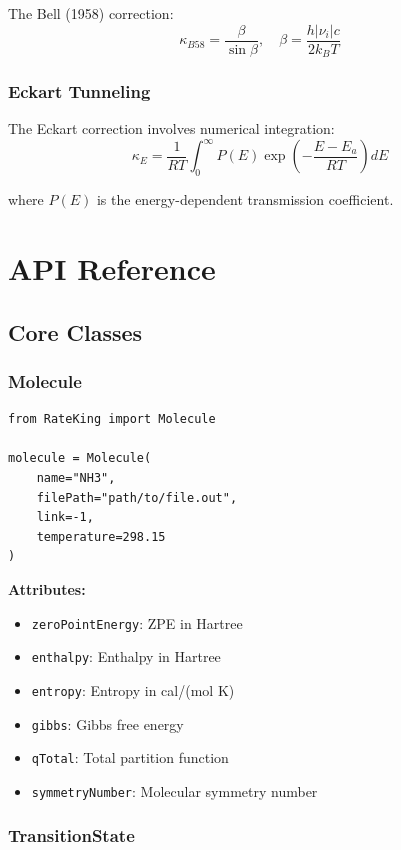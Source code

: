 \documentclass[11pt,a4paper]{book}
\begin{document}
The Bell (1958) correction:
\begin{equation}
\kappa_{B58} = \frac{\beta}{\sin\beta}, \quad \beta = \frac{h|\nu_i|c}{2k_B T}
\end{equation}

\subsection{Eckart Tunneling}

The Eckart correction involves numerical integration:
\begin{equation}
\kappa_E = \frac{1}{RT}\int_0^\infty P(E) \exp\left(-\frac{E-E_a}{RT}\right) dE
\end{equation}

where $P(E)$ is the energy-dependent transmission coefficient.

\chapter{API Reference}

\section{Core Classes}

\subsection{Molecule}

\begin{lstlisting}
from RateKing import Molecule

molecule = Molecule(
    name="NH3",
    filePath="path/to/file.out",
    link=-1,
    temperature=298.15
)
\end{lstlisting}

\textbf{Attributes:}
\begin{itemize}
  \item \texttt{zeroPointEnergy}: ZPE in Hartree
  \item \texttt{enthalpy}: Enthalpy in Hartree
  \item \texttt{entropy}: Entropy in cal/(mol K)
  \item \texttt{gibbs}: Gibbs free energy
  \item \texttt{qTotal}: Total partition function
  \item \texttt{symmetryNumber}: Molecular symmetry number
\end{itemize}

\subsection{TransitionState}
\end{document}
